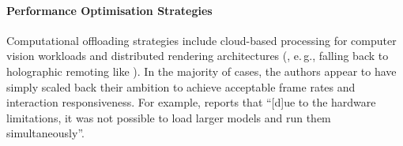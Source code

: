\paragraph{Performance Optimisation Strategies}

Computational offloading strategies include cloud-based processing for computer vision workloads and distributed rendering architectures (, e.\,g., falling back to holographic remoting like \cite{stacchio2023annHoloTator}). In the majority of cases, the authors appear to have simply scaled back their ambition to achieve acceptable frame rates and interaction responsiveness. For example, \cite{reis2021caseStudy} reports that ``[d]ue to the hardware limitations, it was not possible to load larger models and run them simultaneously''.



